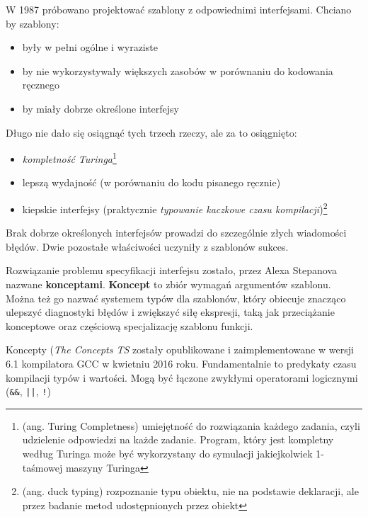 \documentclass[11pt, a4paper]{article}
\begin{document}
\lstset{language=C++}

W 1987 próbowano projektować szablony z odpowiednimi interfejsami. Chciano by szablony:

\begin{itemize}

\item były w pełni ogólne i wyraziste
\item by nie wykorzystywały większych zasobów w porównaniu do kodowania ręcznego
\item by miały dobrze określone interfejsy

\end{itemize}

\noindent Długo nie dało się osiągnąć tych trzech rzeczy, ale za to osiągnięto:

\begin{itemize}

\item \emph{kompletność Turinga}\footnote{(ang. Turing Completness) umiejętność do rozwiązania każdego zadania, czyli udzielenie odpowiedzi na każde zadanie. Program, który jest kompletny według Turinga może być wykorzystany do symulacji jakiejkolwiek 1-taśmowej maszyny Turinga}
\item lepszą wydajność (w porównaniu do kodu pisanego ręcznie)
\item kiepskie interfejsy (praktycznie \emph{typowanie kaczkowe czasu kompilacji})\footnote{(ang. duck typing) rozpoznanie typu obiektu, nie na podstawie deklaracji, ale przez badanie metod udostępnionych przez obiekt}

\end{itemize}

Brak dobrze określonych interfejsów prowadzi do szczególnie złych wiadomości błędów. Dwie pozostałe właściwości uczyniły z szablonów sukces.

Rozwiązanie problemu specyfikacji interfejsu zostało, przez Alexa Stepanova nazwane \textbf{konceptami}. \textbf{Koncept} to zbiór wymagań argumentów szablonu. Można też go nazwać systemem typów dla szablonów, który obiecuje znacząco ulepszyć diagnostyki błędów i zwiększyć siłę ekspresji, taką jak przeciążanie konceptowe oraz częściową specjalizację szablonu funkcji.

Koncepty (\emph{The Concepts TS} zostały opublikowane i zaimplementowane w wersji 6.1 kompilatora GCC w kwietniu 2016 roku. Fundamentalnie to predykaty czasu kompilacji typów i wartości. Mogą być łączone zwykłymi operatorami logicznymi (\verb#&&#, \verb#||#, \verb#!#)

\end{document}
